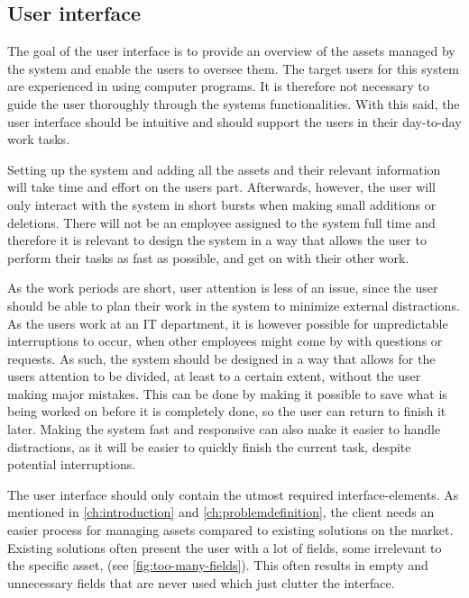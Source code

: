 \subsection{User interface}\label{ssc:UIAnalysis}
The goal of the user interface is to provide an overview of the assets managed by the system and enable the users to oversee them. The target users for this system are experienced in using computer programs. It is therefore not necessary to guide the user thoroughly through the systems functionalities. With this said, the user interface should be intuitive and should support the users in their day-to-day work tasks.
\par

Setting up the system and adding all the assets and their relevant information will take time and effort on the users part. Afterwards, however, the user will only interact with the system in short bursts when making small additions or deletions. There will not be an employee assigned to the system full time and therefore it is relevant to design the system in a way that allows the user to perform their tasks as fast as possible, and get on with their other work.
\par
As the work periods are short, user attention is less of an issue, since the user should be able to plan their work in the system to minimize external distractions. As the users work at an IT department, it is however possible for unpredictable interruptions to occur, when other employees might come by with questions or requests. As such, the system should be designed in a way that allows for the users attention to be divided, at least to a certain extent, without the user making major mistakes. This can be done by making it possible to save what is being worked on before it is completely done, so the user can return to finish it later. Making the system fast and responsive can also make it easier to handle distractions, as it will be easier to quickly finish the current task, despite potential interruptions.
\par

The user interface should only contain the utmost required interface-elements. As mentioned in \autoref{ch:introduction} and \autoref{ch:problemdefinition}, the client needs an easier process for managing assets compared to existing solutions on the market. Existing solutions often present the user with a lot of fields, some irrelevant to the specific asset, (see \autoref{fig:too-many-fields}). This often results in empty and unnecessary fields that are never used which just clutter the interface.

